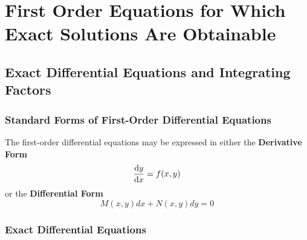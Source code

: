 
\section{First Order Equations for Which Exact Solutions Are Obtainable}


\subsection{Exact Differential Equations and Integrating Factors}


\subsubsection{Standard Forms of First-Order Differential Equations}
The first-order differential equations may be expressed in either the \textbf{Derivative Form}
\begin{equation} \label{eq:derivative-form}
    \dv{y}{x} = f(x,y)
\end{equation}
or the \textbf{Differential Form}
\begin{equation} \label{eq:differential-form}
    M(x,y) d{x} + N(x,y) d{y} = 0
\end{equation}


\vspace{20pt}
\subsubsection{Exact Differential Equations}

